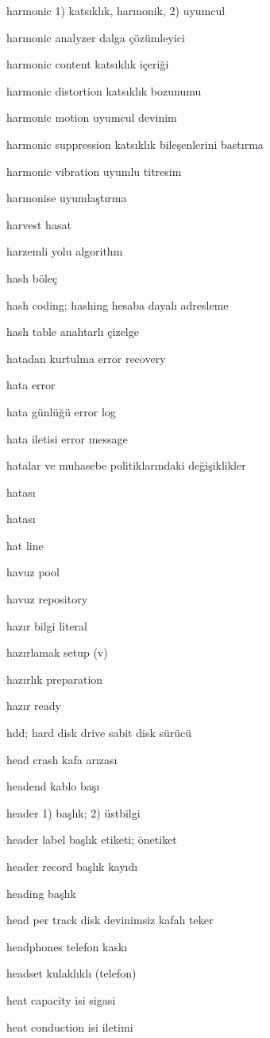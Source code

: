 \documentclass[12pt,fleqn]{article}\usepackage{../../common}
\begin{document}
harmonic 1) katsıklık, harmonik, 2) uyumcul

harmonic analyzer dalga çözümleyici

harmonic content katsıklık içeriği

harmonic distortion katsıklık bozunumu

harmonic motion uyumcul devinim

harmonic suppression katsıklık bileşenlerini bastırma

harmonic vibration uyumlu titresim

harmonise uyumlaştırma

harvest hasat

harzemli yolu algorithm

hash böleç

hash coding; hashing hesaba dayalı adresleme

hash table anahtarlı çizelge

hatadan kurtulma error recovery

hata error

hata günlüğü error log

hata iletisi error message

hatalar ve muhasebe politiklarındaki değişiklikler

hatası

hatası

hat line

havuz pool

havuz repository

hazır bilgi literal

hazırlamak setup (v)

hazırlık preparation

hazır ready

hdd; hard disk drive sabit disk sürücü

head crash kafa arızası

headend kablo başı

header 1) başlık; 2) üstbilgi

header label başlık etiketi; önetiket

header record başlık kayıdı

heading başlık

head per track disk devinimsiz kafalı teker

headphones telefon kaskı

headset kulaklıklı (telefon)

heat capacity isi sigasi

heat conduction isi iletimi
\end{document}
